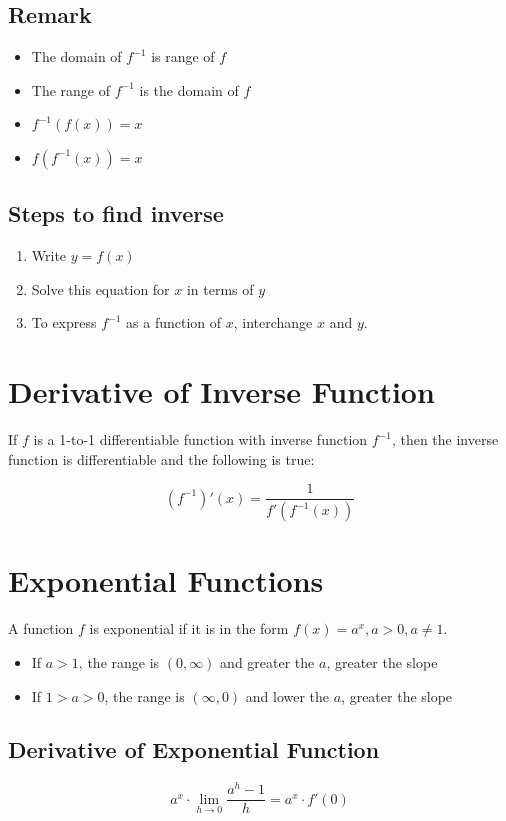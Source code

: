\documentclass[12pt]{article}
\begin{document}
\subsection{Remark} 
\begin{itemize}
    \item The domain of $f^{-1}$ is range of $f$
    \item The range of $f^{-1}$ is the domain of $f$
    \item $f^{-1}(f(x)) = x$
    \item $f(f^{-1}(x)) = x$
\end{itemize}


\subsection{Steps to find inverse}
\begin{enumerate}
    \item Write $y=f(x)$
    \item Solve this equation for $x$ in terms of $y$
    \item To express $f^{-1}$ as a function of $x$, interchange $x$ and $y$.
\end{enumerate}

\section{Derivative of Inverse Function}\label{Derivative of Inverse Function}
If $f$ is a 1-to-1 differentiable function with inverse function $f^{-1}$, then the inverse function is differentiable and the following is true: 

$$(f^{-1})'(x) = \frac{1}{f'(f^{-1}(x))}$$




\section{Exponential Functions}
A function $f$ is  exponential if it is in the form $f(x)=a^x, a>0, a\neq 1$. 
\begin{itemize}
    \item If $a>1$, the range is $(0, \infty)$ and greater the $a$, greater the slope
    \item If $1>a>0$, the range is $(\infty, 0)$ and lower the $a$, greater the slope
\end{itemize}

\subsection{Derivative of Exponential Function}
$$a^x \cdot \lim_{h\to0} \frac{a^h-1}{h} = a^x \cdot f'(0)$$
\end{document}
